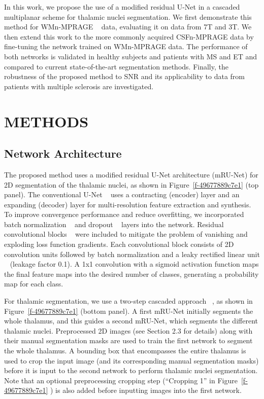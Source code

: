 \documentclass[3p,,final,12pt]{elsarticle}
\begin{document}
In this work, we propose the use of a modified residual U-Net in a cascaded multiplanar scheme for thalamic nuclei segmentation. We first demonstrate this method for WMn-MPRAGE \unskip~\cite{1643371:26789961} data, evaluating it on data from 7T and 3T. We then extend this work to the more commonly acquired CSFn-MPRAGE data by fine-tuning the network trained on WMn-MPRAGE data. The performance of both networks is validated in healthy subjects and patients with MS and ET and compared to current state-of-the-art segmentation methods. Finally, the robustness of the proposed method to SNR and its applicability to data from patients with multiple sclerosis are investigated.
    
\section{METHODS}




\subsection{Network Architecture} The proposed method uses a modified residual U-Net architecture (mRU-Net) for 2D segmentation of the thalamic nuclei, as shown in Figure~\ref{f-49677889c7e1}  (top panel). The conventional U-Net \unskip~\cite{1643371:26789965} uses a contracting (encoder) layer and an expanding (decoder) layer for multi-resolution feature extraction and synthesis. To improve convergence performance and reduce overfitting, we incorporated batch normalization \unskip~\cite{1643371:26789970} and dropout \unskip~\cite{1643371:26789907} layers into the network. Residual convolutional blocks \unskip~\cite{1643371:26789905} were included to mitigate the problem of vanishing and exploding loss function gradients. Each convolutional block consists of 2D convolution units followed by batch normalization and a leaky rectified linear unit \unskip~\cite{1643371:26789910} (leakage factor 0.1). A 1x1 convolution with a sigmoid activation function maps the final feature maps into the desired number of classes, generating a probability map for each class. 

For thalamic segmentation, we use a two-step cascaded approach \unskip~\cite{1643371:26789931}, as shown in Figure~\ref{f-49677889c7e1}  (bottom panel). A first mRU-Net initially segments the whole thalamus, and this guides a second mRU-Net, which segments the different thalamic nuclei. Preprocessed 2D images (see Section 2.3 for details) along with their manual segmentation masks are used to train the first network to segment the whole thalamus. A bounding box that encompasses the entire thalamus is used to crop the input image (and its corresponding manual segmentation masks) before it is input to the second network to perform thalamic nuclei segmentation. Note that an optional preprocessing cropping step (``Cropping 1'' in Figure~\ref{f-49677889c7e1} ) is also added before inputting images into the first network.
\end{document}
